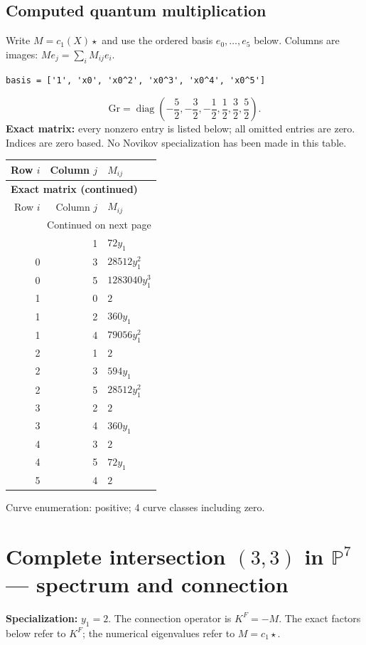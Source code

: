 \documentclass[10pt,a4paper]{article}
\begin{document}
\subsection*{Computed quantum multiplication}
Write $M=c_1(X)\star$ and use the ordered basis $e_0,\ldots,e_{5}$ below. Columns are images: $M e_j=\sum_i M_{ij}e_i$.
\begin{lstlisting}
basis = ['1', 'x0', 'x0^2', 'x0^3', 'x0^4', 'x0^5']
\end{lstlisting}
\[\mathrm{Gr}=\operatorname{diag}\!\left(- \frac{5}{2},- \frac{3}{2},- \frac{1}{2},\frac{1}{2},\frac{3}{2},\frac{5}{2}\right).\]
\textbf{Exact matrix:} every nonzero entry is listed below; all omitted entries are zero. Indices are zero based. No Novikov specialization has been made in this table.
{\small\setlength{\tabcolsep}{7pt}\begin{longtable}{rrp{125mm}}
\toprule Row $i$ & Column $j$ & $M_{ij}$\\\midrule\endfirsthead
\multicolumn{3}{l}{\textbf{Exact matrix (continued)}}\\
\toprule Row $i$ & Column $j$ & $M_{ij}$\\\midrule\endhead
\midrule\multicolumn{3}{r}{Continued on next page}\\\endfoot\bottomrule\endlastfoot
0 & 1 & $72 y_{1}$\\
0 & 3 & $28512 y_{1}^{2}$\\
0 & 5 & $1283040 y_{1}^{3}$\\
1 & 0 & $2$\\
1 & 2 & $360 y_{1}$\\
1 & 4 & $79056 y_{1}^{2}$\\
2 & 1 & $2$\\
2 & 3 & $594 y_{1}$\\
2 & 5 & $28512 y_{1}^{2}$\\
3 & 2 & $2$\\
3 & 4 & $360 y_{1}$\\
4 & 3 & $2$\\
4 & 5 & $72 y_{1}$\\
5 & 4 & $2$\\
\end{longtable}}
Curve enumeration: positive; 4 curve classes including zero.
\clearpage\section*{Complete intersection $(3,3)$ in $\mathbb P^{7}$ --- spectrum and connection}
\textbf{Specialization:} $y_1=2$. The connection operator is $K^F=-M$. The exact factors below refer to $K^F$; the numerical eigenvalues refer to $M=c_1\star$.
\end{document}
